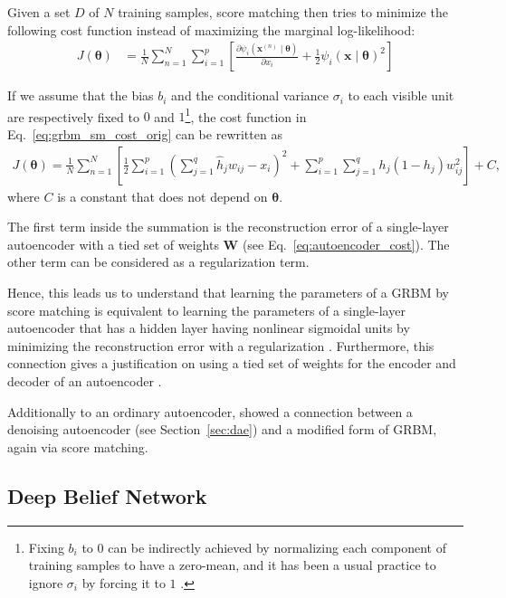 \documentclass{now}
\newcommand{\vect}[1]{\mathbf{#1}}
\newcommand{\vects}[1]{\boldsymbol{#1}}
\newcommand{\matr}[1]{\mathbf{#1}}
\newcommand{\vx}[0]{\vect{x}}
\newcommand{\mW}[0]{\matr{W}}
\newcommand{\TT}[0]{{\vects{\theta}}}
\begin{document}
Given a set $D$ of $N$ training samples, score matching
then tries to minimize the following cost function
instead of maximizing the marginal log-likelihood:
\begin{align}
    \label{eq:grbm_sm_cost_orig}
    J(\TT) &= \frac{1}{N} \sum_{n=1}^N \sum_{i=1}^p \left[
    \frac{\partial \psi_i(\vx^{(n)} \mid \TT)}{\partial x_i}
    + \frac{1}{2} \psi_i (\vx \mid \TT)^2
    \right]
\end{align}

If we assume that the bias $b_i$ and the conditional
variance $\sigma_i$ to each visible unit are respectively
fixed to $0$ and $1$\footnote{ Fixing $b_i$ to $0$ can be
indirectly achieved by normalizing each component of
training samples to have a zero-mean, and it has been a
usual practice to ignore $\sigma_i$ by forcing it to $1$
\citep[see, e.g.,][]{Hinton2012rbm}.  }, the cost function in
Eq.~\eqref{eq:grbm_sm_cost_orig} can be rewritten as
\begin{align*}
    J(\TT) = \frac{1}{N} \sum_{n=1}^N \left[ \frac{1}{2}
    \sum_{i=1}^p \left( \sum_{j=1}^q \hat{h}_j w_{ij} - x_i
    \right)^2 + \sum_{i=1}^p \sum_{j=1}^q h_j(1 - h_j)
    w_{ij}^2 \right] + C,
\end{align*}
where $C$ is a constant that does not depend on $\TT$.

The first term inside the summation
is the reconstruction error of a single-layer autoencoder
with a tied set of weights $\mW$ (see
Eq.~\eqref{eq:autoencoder_cost}). The other term can be
considered as a regularization term.

Hence, this leads us to understand that learning the
parameters of a GRBM by score matching is equivalent to
learning the parameters of a single-layer autoencoder that
has a hidden layer having nonlinear sigmoidal units by
minimizing the reconstruction error with a regularization
\citep{Swersky2011}. Furthermore, this connection gives a
justification on using a tied set of weights for the
encoder and decoder of an autoencoder \citep{Vincent2011}.

Additionally to an ordinary autoencoder, \citet{Vincent2011}
showed a connection between a denoising autoencoder (see
Section~\ref{sec:dae}) and a modified form of GRBM, again
via score matching. 


\clearpage
\subsection{Deep Belief Network}
\label{sec:dbn}
\end{document}
